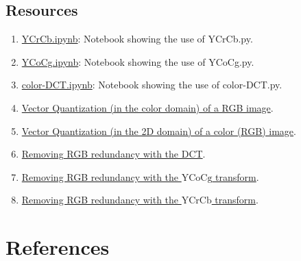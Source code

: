 \subsection*{Resources}
\begin{enumerate}
\item \href{https://github.com/Sistemas-Multimedia/VCF/blob/main/notebooks/YCrCb.ipynb}{YCrCb.ipynb}: Notebook showing the use of YCrCb.py.
\item \href{https://github.com/Sistemas-Multimedia/VCF/blob/main/notebooks/YCoCg.ipynb}{YCoCg.ipynb}: Notebook showing the use of YCoCg.py.
\item \href{https://github.com/Sistemas-Multimedia/VCF/blob/main/notebooks/YCoCg.ipynb}{color-DCT.ipynb}: Notebook showing the use of color-DCT.py.
\item \href{https://github.com/vicente-gonzalez-ruiz/vector_quantization/blob/main/docs/RGB_VQ.ipynb}{Vector
    Quantization (in the color domain) of a RGB image}.
\item \href{https://github.com/vicente-gonzalez-ruiz/vector_quantization/blob/main/docs/spatial_color_VQ.ipynb}{Vector
  Quantization (in the 2D domain) of a color (RGB) image}.
\item \href{https://github.com/vicente-gonzalez-ruiz/color_transforms/blob/main/docs/3DCT/3DCT_over_RGB.ipynb}{Removing RGB redundancy with the DCT}.
\item \href{https://github.com/vicente-gonzalez-ruiz/color_transforms/blob/main/docs/YCoCg/YCoCg_over_RGB.ipynb}{Removing RGB redundancy with the $\text{YCoCg}$ transform}.
\item \href{https://github.com/vicente-gonzalez-ruiz/color_transforms/blob/main/docs/YCrCb/YCrCb_over_RGB.ipynb}{Removing RGB redundancy with the $\text{YCrCb}$ transform}.
\end{enumerate}
  
\section{References}

\renewcommand{\addcontentsline}[3]{}%


